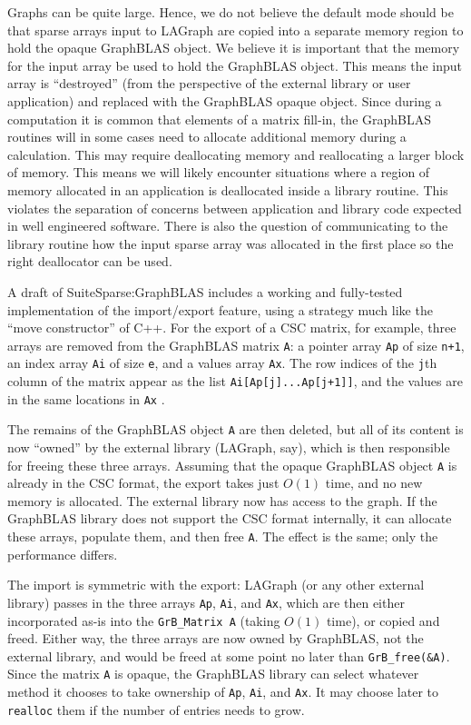 Graphs can be quite large.   Hence, we do not believe the default mode should be that 
sparse arrays input to LAGraph are copied into a separate memory region to hold the 
opaque GraphBLAS object.  We believe it is important that the memory for the input array
be used to hold the GraphBLAS object. This means the input array is ``destroyed''
(from the perspective of the external library or user application) and replaced
with the GraphBLAS opaque object.  Since during a computation it is common that elements of a
matrix fill-in, the GraphBLAS routines will in some cases need to allocate additional memory during a 
calculation.  This may require deallocating memory and reallocating a larger block of memory.
This means we will likely encounter situations where a region of memory allocated in an application
is deallocated inside a library routine.  This violates the separation of concerns between application
and library code expected in well engineered software. There is also the question of communicating
to the library routine how the input sparse array was allocated in the first place so the right deallocator 
can be used.

A draft of SuiteSparse:GraphBLAS includes a working and fully-tested
implementation of the import/export feature, using a strategy much like the
``move constructor'' of C++.  For the export of a CSC matrix, for example,
three arrays are removed from the GraphBLAS matrix \verb'A': a pointer array
\verb'Ap' of size \verb'n+1', an index array \verb'Ai' of size \verb'e', and a
values array \verb'Ax'.  The row indices of the  \verb'j'th column of the
matrix appear as the list \verb'Ai[Ap[j]...Ap[j+1]]', and the values are in the
same locations in \verb'Ax' \cite{Davis06book}.

The remains of the GraphBLAS object \verb'A' are then deleted, but all of its
content is now ``owned'' by the external library (LAGraph, say), which is then
responsible for freeing these three arrays.  Assuming that the opaque GraphBLAS
object \verb'A' is already in the CSC format, the export takes just $O(1)$
time, and no new memory is allocated.  The external library now has access to
the graph.  If the GraphBLAS library does not support the CSC format
internally, it can allocate these arrays, populate them, and then free
\verb'A'.  The effect is the same; only the performance differs.

The import is symmetric with the export:  LAGraph (or any other external
library) passes in the three arrays \verb'Ap', \verb'Ai', and \verb'Ax', which
are then either incorporated as-is into the \verb'GrB_Matrix A' (taking $O(1)$
time), or copied and freed.  Either way, the three arrays are now owned by
GraphBLAS, not the external library, and would be freed at some point no later
than \verb'GrB_free(&A)'.  Since the matrix \verb'A' is opaque, the GraphBLAS
library can select whatever method it chooses to take ownership of \verb'Ap',
\verb'Ai', and \verb'Ax'.  It may choose later to \verb'realloc' them if the
number of entries needs to grow.

